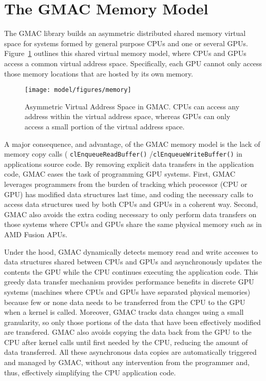 \section{The GMAC Memory Model}

The GMAC library builds an asymmetric distributed shared memory virtual space for systems formed by 
general purpose CPUs and one or several GPUs. Figure~\ref{fig:overview:memory} outlines this shared 
virtual memory model, where CPUs and GPUs access a common virtual address space. Specifically, each 
GPU cannot only access those memory locations that are hosted by its own memory.

\begin{figure}
\centering
\texttt{[image: model/figures/memory]}
\caption{Asymmetric Virtual Address Space in GMAC\@. CPUs can access any address within the virtual 
address space, whereas GPUs can only access a small portion of the virtual address space.}
\label{fig:overview:memory}
\end{figure}

A major consequence, and advantage, of the GMAC memory model is the lack of memory copy calls (\eg 
\texttt{clEnqueue\-Read\-Buffer()} \slash \texttt{clEnqueue\-Write\-Buffer()} in applications source 
code.  By removing explicit data transfers in the application code, GMAC eases the task of 
programming GPU systems. First, GMAC leverages programmers from the burden of tracking which 
processor (\ie CPU or GPU) has modified data structures last time, and coding the necessary calls to 
access data structures used by both CPUs and GPUs in a coherent way. Second, GMAC also avoids the 
extra coding necessary to only perform data transfers on those systems where CPUs and GPUs share the 
same physical memory such as in AMD Fusion APUs.

Under the hood, GMAC dynamically detects memory read and write accesses to data structures shared 
between CPUs and GPUs and asynchronously updates the contents the GPU while the CPU continues 
executing the application code. This greedy data transfer mechanism provides performance benefits in 
discrete GPU systems (\ie machines where CPUs and GPUs have separated physical memories) because few 
or none data needs to be transferred from the CPU to the GPU when a kernel is called. Moreover, GMAC 
tracks data changes using a small granularity, so only those portions of the data that have been 
effectively modified are transfered. GMAC also avoids copying the data back from the GPU to the CPU 
after kernel calls until first needed by the CPU, reducing the amount of data transferred. All these 
asynchronous data copies are automatically triggered and managed by GMAC, without any intervention 
from the programmer and, thus, effectively simplifying the CPU application code.

